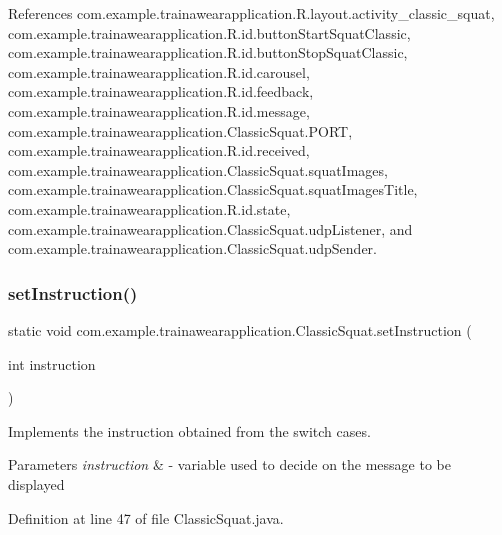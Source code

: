 References com.\+example.\+trainawearapplication.\+R.\+layout.\+activity\+\_\+classic\+\_\+squat, com.\+example.\+trainawearapplication.\+R.\+id.\+button\+Start\+Squat\+Classic, com.\+example.\+trainawearapplication.\+R.\+id.\+button\+Stop\+Squat\+Classic, com.\+example.\+trainawearapplication.\+R.\+id.\+carousel, com.\+example.\+trainawearapplication.\+R.\+id.\+feedback, com.\+example.\+trainawearapplication.\+R.\+id.\+message, com.\+example.\+trainawearapplication.\+Classic\+Squat.\+P\+O\+RT, com.\+example.\+trainawearapplication.\+R.\+id.\+received, com.\+example.\+trainawearapplication.\+Classic\+Squat.\+squat\+Images, com.\+example.\+trainawearapplication.\+Classic\+Squat.\+squat\+Images\+Title, com.\+example.\+trainawearapplication.\+R.\+id.\+state, com.\+example.\+trainawearapplication.\+Classic\+Squat.\+udp\+Listener, and com.\+example.\+trainawearapplication.\+Classic\+Squat.\+udp\+Sender.

\mbox{\label{classcom_1_1example_1_1trainawearapplication_1_1_classic_squat_a3a096fd4064cf28568fd13336c77d28f}} 
\subsubsection{\texorpdfstring{setInstruction()}{setInstruction()}}
{\footnotesize\ttfamily static void com.\+example.\+trainawearapplication.\+Classic\+Squat.\+set\+Instruction (\begin{DoxyParamCaption}\item[{int}]{instruction }\end{DoxyParamCaption})\hspace{0.3cm}{\ttfamily [static]}}



Implements the instruction obtained from the switch cases. 


\begin{DoxyParams}{Parameters}
{\em instruction} & -\/ variable used to decide on the message to be displayed \\
\hline
\end{DoxyParams}


Definition at line 47 of file Classic\+Squat.\+java.


